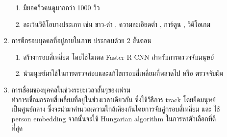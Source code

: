 \begin{enumerate}
\begin{enumerate}
\begin{enumerate}
\begin{enumerate}
				\item มียอดวิวคนดูมากกว่า 1000 วิว
				\item ละเว้นวิดิโอบางประเภท เช่น ขาว-ดำ , ความละเอียดต่ำ , การ์ตูน , วิดิโอเกม
			\end{enumerate}
%
		\item  การตีกรอบบุคคลที่อยู่ภายในภาพ ประกอบด้วย 2 ขั้นตอน
			\begin{enumerate}
				\item สร้างกรอบสี่เหลี่ยม โดยใช้โมเดล Faster R-CNN สำหรับการตรวจจับมนุษย์
				\item นำมนุษย์มาใช้ในการตรวจสอบและแก้ไขกรอบสี่เหลี่ยมที่พลาดไป หรือ ตรวจจับผิด
			\end{enumerate}	
		\item  การเชื่อมของบุคคลในช่วงระยะเวลาสั้นๆของเฟรม 
\\
ทำการเชื่อมกรอบสี่เหลี่ยมที่อยู่ในช่วงเวลาเดียวกัน ซึ่งใช้วิธีการ track โดยยึดมนุษย์เป็นศูนย์กลาง ซึ่งจะนำมาคำนวณความใกล้เคียงกันโดยการจับคู่กรอบสี่เหลี่ยม และ ใช้ person embedding จากนั้นจะใช้ Hungarian algorithm ในการหาตัวเลือกที่ดีที่สุด


\end{enumerate}
\end{enumerate}
\end{enumerate}
